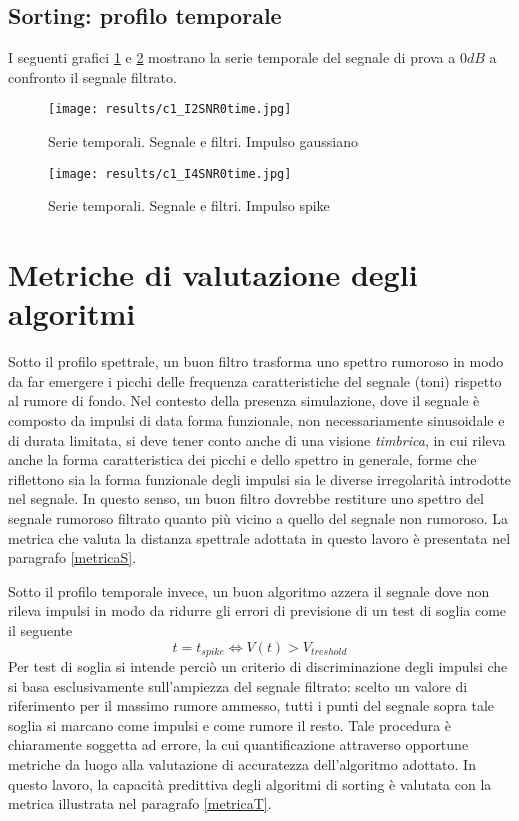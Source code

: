 \documentclass[9pt,twocolumn,twoside]{osajnl}
\begin{document}
\subsection{Sorting: profilo temporale}

I seguenti grafici \ref{fig:c1_I2SNR0time} e \ref{fig:c1_I4SNR0time} mostrano la serie temporale del segnale di prova a $0dB$ a confronto il segnale filtrato.

\begin{figure}[htbp]
\centering
\texttt{[image: results/c1\_I2SNR0time.jpg]}
\caption{Serie temporali. Segnale e filtri. Impulso gaussiano}
\label{fig:c1_I2SNR0time}
\end{figure}

\begin{figure}[htbp]
\centering
\texttt{[image: results/c1\_I4SNR0time.jpg]}
\caption{Serie temporali. Segnale e filtri. Impulso spike}
\label{fig:c1_I4SNR0time}
\end{figure}




\section{Metriche di valutazione degli algoritmi}

Sotto il profilo spettrale, un buon filtro trasforma uno spettro rumoroso in modo da far emergere i picchi delle frequenza caratteristiche del segnale (toni) rispetto al rumore di fondo.
%
Nel contesto della presenza simulazione, dove il segnale è composto da impulsi di data forma funzionale, non necessariamente sinusoidale e di durata limitata, si deve tener conto anche di una visione {\it timbrica}, in cui rileva anche la forma caratteristica dei picchi e dello spettro in generale, forme che riflettono sia la forma funzionale degli impulsi sia le diverse irregolarità introdotte nel segnale.
%
In questo senso, un buon filtro dovrebbe restiture uno spettro del segnale rumoroso filtrato quanto più vicino a quello del segnale non rumoroso.
La metrica che valuta la distanza spettrale adottata in questo lavoro è presentata nel paragrafo \ref{metricaS}.

Sotto il profilo temporale invece, un buon algoritmo azzera il segnale dove non rileva impulsi in modo da ridurre gli errori di previsione di un test di soglia come il seguente
\begin{equation*}
t = t_{spike} \Leftrightarrow V(t) > V_{treshold}
\end{equation*}
Per test di soglia si intende perciò un criterio di discriminazione degli impulsi che si basa esclusivamente sull'ampiezza del segnale filtrato: scelto un valore di riferimento per il massimo rumore ammesso, tutti i punti del segnale sopra tale soglia si marcano come impulsi e come rumore il resto.
Tale procedura è chiaramente soggetta ad errore, la cui quantificazione 
attraverso opportune metriche da luogo alla valutazione di accuratezza dell'algoritmo adottato. In questo lavoro, la capacità predittiva degli algoritmi di sorting è valutata con la metrica illustrata nel paragrafo \ref{metricaT}.
\end{document}
